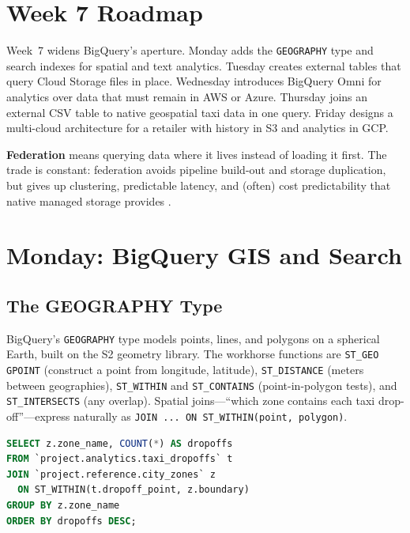 \section{Week 7 Roadmap}
Week~7 widens BigQuery's aperture. Monday adds the \texttt{GEOGRAPHY} type and search indexes for spatial and text analytics. Tuesday creates external tables that query Cloud Storage files in place. Wednesday introduces BigQuery Omni for analytics over data that must remain in AWS or Azure. Thursday joins an external CSV table to native geospatial taxi data in one query. Friday designs a multi-cloud architecture for a retailer with history in S3 and analytics in GCP.

\begin{definitionbox}
\textbf{Federation} means querying data where it lives instead of loading it first. The trade is constant: federation avoids pipeline build-out and storage duplication, but gives up clustering, predictable latency, and (often) cost predictability that native managed storage provides \cite{googlecloudbigqueryexternal}.
\end{definitionbox}

\section{Monday: BigQuery GIS and Search}

\subsection{The GEOGRAPHY Type}
BigQuery's \texttt{GEOGRAPHY} type models points, lines, and polygons on a spherical Earth, built on the S2 geometry library. The workhorse functions are \texttt{ST\_GEO GPOINT} (construct a point from longitude, latitude), \texttt{ST\_DISTANCE} (meters between geographies), \texttt{ST\_WITHIN} and \texttt{ST\_CONTAINS} (point-in-polygon tests), and \texttt{ST\_INTERSECTS} (any overlap). Spatial joins---``which zone contains each taxi drop-off''---express naturally as \texttt{JOIN ... ON ST\_WITHIN(point, polygon)}.

\begin{lstlisting}[language=SQL,caption={Point-in-polygon spatial join between taxi drop-offs and zones.}]
SELECT z.zone_name, COUNT(*) AS dropoffs
FROM `project.analytics.taxi_dropoffs` t
JOIN `project.reference.city_zones` z
  ON ST_WITHIN(t.dropoff_point, z.boundary)
GROUP BY z.zone_name
ORDER BY dropoffs DESC;
\end{lstlisting}

